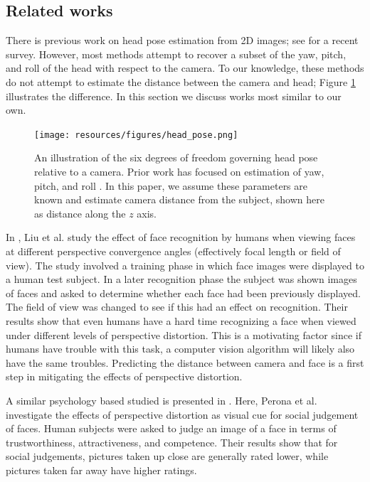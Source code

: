 \documentclass[runningheads]{llncs}
\begin{document}
\subsection{Related works} \label{sec:related}
There is previous work on head pose estimation from 2D images; see \cite{murphy2009head} for a recent survey.
However, most methods attempt to recover a subset of the yaw, pitch, and roll of the head with respect to the camera.
To our knowledge, these methods do not attempt to estimate the distance between the camera and head; Figure \ref{fig:head_pose} illustrates the difference.
In this section we discuss works most similar to our own.

\begin{figure}[ht]
\centering
\texttt{[image: resources/figures/head\_pose.png]}
\caption{
An illustration of the six degrees of freedom governing head pose relative to a camera.
Prior work has focused on estimation of yaw, pitch, and roll \cite{murphy2009head}.
In this paper, we assume these parameters are known and estimate camera distance from the subject, shown here as distance along the $z$ axis.
}
\label{fig:head_pose}
\end{figure}

In \cite{liu2003face,liu2006face}, Liu et al. study the effect of face recognition by humans when viewing faces at different perspective convergence angles (effectively focal length or field of view). 
The study involved a training phase in which face images were displayed to a human test subject.
In a later recognition phase the subject was shown images of faces and asked to determine whether each face had been previously displayed.
The field of view was changed to see if this had an effect on recognition. 
Their results show that even humans have a hard time recognizing a face when viewed under different levels of perspective distortion.  
This is a motivating factor since if humans have trouble with this task, a computer vision algorithm will likely also have the same troubles.  
Predicting the distance between camera and face is a first step in mitigating the effects of perspective distortion.

A similar psychology based studied is presented in \cite{perona2007new,bryan2012perspective}. 
Here, Perona et al. investigate the effects of perspective distortion as visual cue for social judgement of faces.  
Human subjects were asked to judge an image of a face in terms of trustworthiness, attractiveness, and competence.  
Their results show that for social judgements, pictures taken up close are generally rated lower, while pictures taken far away have higher ratings.
\end{document}
